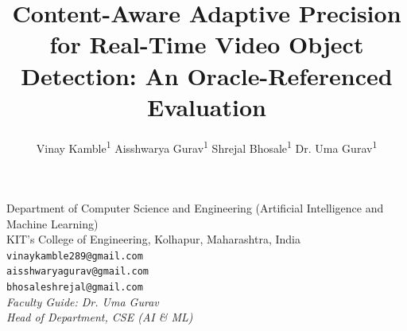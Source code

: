 \documentclass{svproc}
\newcommand{\inst}[1]{\textsuperscript{#1}}
\newcommand{\email}[1]{\texttt{#1}}
\newcommand{\institute}[1]{}
\providecommand{\and}{\quad}
\begin{document}
\title{Content-Aware Adaptive Precision for Real-Time Video Object Detection: An Oracle-Referenced Evaluation}
\author{
  Vinay Kamble\inst{1} \and
  Aisshwarya Gurav\inst{1} \and
  Shrejal Bhosale\inst{1} \and
  Dr. Uma Gurav\inst{1}
}

\ifspringer
  \institute{
    Department of Computer Science and Engineering
    (Artificial Intelligence and Machine Learning),\\
    KIT's College of Engineering, Kolhapur,
    Maharashtra, India\\
    \email{
      vinaykamble289@gmail.com,
      aisshwaryagurav@gmail.com,
      bhosaleshrejal@gmail.com
    }\\
    \textit{Faculty Guide: Dr. Uma Gurav,
    Head of Department, CSE (AI \& ML)}
  }
  \maketitle
\else
  \date{}
  \maketitle
  \vspace{-2em}
  \begin{center}
    \small
    Department of Computer Science and Engineering
    (Artificial Intelligence and Machine Learning)\\
    KIT's College of Engineering, Kolhapur,
    Maharashtra, India\\[4pt]
    \texttt{vinaykamble289@gmail.com}\\
    \texttt{aisshwaryagurav@gmail.com}\\
    \texttt{bhosaleshrejal@gmail.com}\\[4pt]
    \textit{Faculty Guide: Dr. Uma Gurav}\\
    \textit{Head of Department, CSE (AI \& ML)}
  \end{center}
\fi
\end{document}
